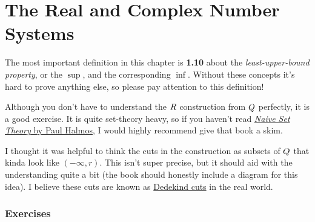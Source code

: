 \chapter{The Real and Complex Number Systems}

The most important definition in this chapter is \textbf{1.10} about the \textit{least-upper-bound property}, or the $\sup$, and the corresponding $\inf$. Without these concepts it's hard to prove anything else, so please pay attention to this definition!

Although you don't have to understand the $R$ construction from $Q$ perfectly, it is a good exercise. It is quite set-theory heavy, so if you haven't read \href{https://amzn.to/3MNZ8e7}{\textit{Naive Set Theory} by Paul Halmos}, I would highly recommend give that book a skim.

I thought it was helpful to think the cuts in the construction as subsets of $Q$ that kinda look like $(-\infty, r)$. This isn't super precise, but it should aid with the understanding quite a bit (the book should honestly include a diagram for this idea).
I believe these cuts are known as \href{https://en.wikipedia.org/wiki/Dedekind_cut}{Dedekind cuts} in the real world.

\subsection*{Exercises}



